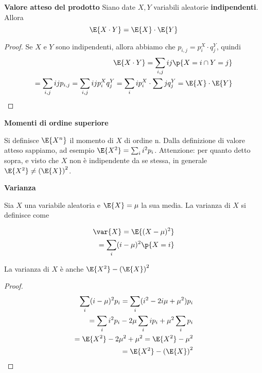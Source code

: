 \begin{prop}
	\textbf{Valore atteso del prodotto}
	Siano date $ X,Y $ variabili aleatorie \textbf{indipendenti}. Allora
	$$\E{X \cdot Y} = \E{X} \cdot \E{Y}
	$$
\end{prop}
\begin{proof}
    Se $X$ e $Y$ sono indipendenti, allora abbiamo che $p_{i,j}= p_i^X\cdot q_j^Y$, quindi
        \begin{equation*}
        \begin{aligned}
        \E{X \cdot Y} = \sum_{i,j} i  j  \p{X = i \cap Y =j} \\
        = \sum_{i,j} i  j p_{i,j} = \sum_{i,j} ij p_i^X q_j^Y =  \sum_{i} i p_i^X \cdot \sum j q_j^Y
        = \E{X} \cdot \E{Y}
        \end{aligned}
        \end{equation*}
\end{proof}


\begin{defn}
	\textbf{Momenti di ordine superiore}

	Si definisce $\E{X^n}$ il momento di $X$ di ordine n.
	Dalla definizione di valore atteso sappiamo, ad esempio $ \E{X^2} = \sum_i i^2 p_i$.
Attenzione: per quanto detto sopra, e visto che $X$ non \`e indipendente da se stessa, in generale
$ \E{X^2} \neq \left(\E{X}\right)^2$.
\end{defn}


\begin{defn}
    \textbf{Varianza}
    
    Sia $ X $ una variabile aleatoria e $ \E{X} = \mu $ la sua media.
    La varianza di $ X $ si definisce come 
    
    \begin{equation*}
    \begin{aligned}
    \var{X} = \E{(X-\mu)^2} \\ 
    = \sum_i (i-\mu)^2 \p{X = i}
    \end{aligned}
    \end{equation*}
\end{defn}
\begin{prop}
    La varianza di $ X $ \`e anche $ \E{X^2} - \left(\E{X}\right)^2 $
\end{prop}
    \begin{proof}
        \begin{equation*}
        \begin{aligned}
        \sum_i (i-\mu)^2 p_i = \sum_i (i^2 -2i\mu + \mu^2) p_i \\
        = \sum_i i^2 p_i - 2\mu \sum_i i p_i + \mu^2 \sum_i p_i \\
        = \E{X^2} - 2\mu^2 + \mu^2 = \E{X^2} - \mu^2 \\
        = \E{X^2} - \left(\E{X}\right)^2 
        \end{aligned}
        \end{equation*}
    \end{proof}

